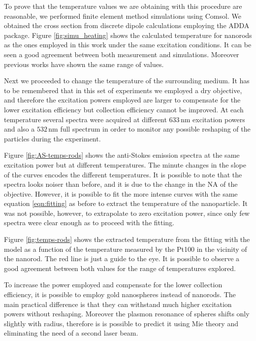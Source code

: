\documentclass[journal=nalefd,manuscript=letter]{achemso}
\newcommand{\nm}{\ensuremath{\,\textrm{nm}}}
\begin{document}
To prove that the temperature values we are obtaining with this procedure are
reasonable, we performed finite element method simulations using Comsol. We
obtained the cross section from discrete dipole calculations employing the ADDA
package. Figure \ref{fig:simu_heating} shows the calculated temperature for
nanorods as the ones employed in this work under the same excitation conditions.
It can be seen a good agreement between both measurement and simulations.
Moreover previous works have shown the same range of values. 

Next we proceeded to change the temperature of the surrounding medium. It has to
be remembered that in this set of experiments we employed a dry objective, and
therefore the excitation powers employed are larger to compensate for the lower
excitation efficiency but collection efficiency cannot be
improved. At each temperature several spectra were acquired at different
$633\nm$ excitation powers and also a $532\nm$ full spectrum in order to monitor
any possible reshaping of the particles during the experiment. 

Figure \ref{fig:AS-temps-rods} shows the anti-Stokes emission spectra at the
same excitation power but at different temperatures. The minute changes in the
slope of the curves encodes the different temperatures. It is possible to note
that the spectra looks noiser than before, and it is due to the change in the
NA of the objective. However, it is possible to fit the more intense curves with
the same equation \ref{eqn:fitting} as before to extract the temperature of the
nanoparticle. It was not possible, however, to extrapolate to zero excitation
power, since only few spectra were clear enough as to proceed with the fitting. 

Figure \ref{fig:temps-rods} shows the extracted temperature from the fitting
with the model as a function of the temperature measured by the Pt100 in the
vicinity of the nanorod. The red line is just a guide to the eye. It is possible
to observe a good agreement between both values for the range of
temperatures explored. 

To increase the power employed and compensate for the lower collection
efficiency, it is possible to employ gold nanospheres instead of nanorods. The
main practical difference is that they can withstand much higher excitation
powers without reshaping. Moreover the plasmon resonance of spheres shifts only
slightly with radius, therefore is is possible to predict it using
Mie theory and eliminating the need of a second laser beam. 
\end{document}
